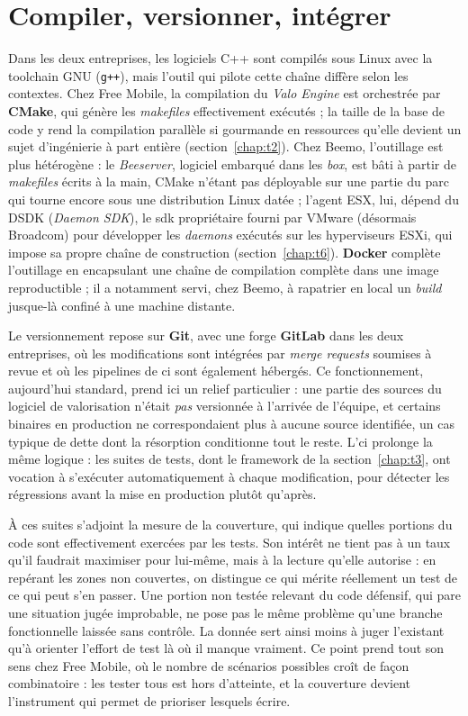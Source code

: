 \section{Compiler, versionner, intégrer}
Dans les deux entreprises, les logiciels C++ sont compilés sous Linux avec la
\gls{toolchain} GNU (\texttt{g++}), mais l'outil qui pilote cette chaîne diffère
selon les contextes. Chez Free Mobile, la compilation du \emph{Valo Engine} est
orchestrée par \textbf{CMake}, qui génère les \emph{makefiles} effectivement
exécutés ; la taille de la base de code y rend la compilation parallèle si
gourmande en ressources qu'elle devient un sujet d'ingénierie à part entière
(section~\ref{chap:t2}). Chez Beemo, l'outillage est plus hétérogène : le
\emph{Beeserver}, logiciel embarqué dans les \emph{box}, est bâti à partir de
\emph{makefiles} écrits à la main, CMake n'étant pas déployable sur une partie
du parc qui tourne encore sous une distribution Linux datée ; l'agent ESX, lui,
dépend du DSDK (\emph{Daemon SDK}), le \gls{sdk} propriétaire fourni par VMware
(désormais Broadcom) pour développer les \emph{daemons} exécutés sur les
hyperviseurs ESXi, qui impose sa propre chaîne de construction
(section~\ref{chap:t6}). \textbf{Docker} complète l'outillage en encapsulant une
chaîne de compilation complète dans une image reproductible ; il a notamment
servi, chez Beemo, à rapatrier en local un \emph{build} jusque-là confiné à une
machine distante.

Le versionnement repose sur \textbf{Git}, avec une forge \textbf{GitLab} dans
les deux entreprises, où les modifications sont intégrées par \emph{merge
requests} soumises à revue et où les pipelines de \gls{ci} sont également
hébergés. Ce fonctionnement, aujourd'hui standard, prend ici un relief
particulier : une partie des sources du logiciel de valorisation n'était
\emph{pas} versionnée à l'arrivée de l'équipe, et certains binaires en
production ne correspondaient plus à aucune source identifiée, un cas typique
de dette dont la résorption conditionne tout le reste. L'\gls{ci} prolonge la
même logique : les suites de tests, dont le framework de la
section~\ref{chap:t3}, ont vocation à s'exécuter automatiquement à chaque
modification, pour détecter les régressions avant la mise en production plutôt
qu'après.

À ces suites s'adjoint la mesure de la \gls{couverture}, qui
indique quelles portions du code sont effectivement exercées par les tests. Son
intérêt ne tient pas à un taux qu'il faudrait maximiser pour lui-même, mais à la
lecture qu'elle autorise : en repérant les zones non couvertes, on distingue ce
qui mérite réellement un test de ce qui peut s'en passer. Une portion non testée
relevant du code défensif, qui pare une situation jugée improbable, ne pose pas
le même problème qu'une branche fonctionnelle laissée sans contrôle. La donnée
sert ainsi moins à juger l'existant qu'à orienter l'effort de test là où il
manque vraiment. Ce point prend tout son sens chez Free Mobile, où le nombre de
scénarios possibles croît de façon combinatoire : les tester tous est hors
d'atteinte, et la couverture devient l'instrument qui permet de prioriser
lesquels écrire.


